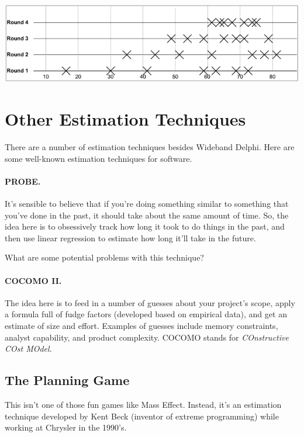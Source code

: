 \includegraphics[width=\textwidth]{images/converging-effort-estimates.png}

\section*{Other Estimation Techniques}
There are a number of estimation techniques besides Wideband Delphi.
Here are some well-known estimation techniques for software.

\paragraph{PROBE.} It's sensible to believe that if you're doing something
similar to something that you've done in the past, it should take about
the same amount of time. So, the idea here is to obsessively track
how long it took to do things in the past, and then use linear
regression to estimate how long it'll take in the future. 

{\sf What are some potential problems with this technique?}\\[3em]


\paragraph{COCOMO II.} The idea here is to feed in a number of guesses
about your project's scope, apply a formula full of fudge factors
(developed based on empirical data), and get an estimate of size and
effort. Examples of guesses include memory constraints, analyst
capability, and product complexity.  COCOMO stands for
\emph{COnstructive COst MOdel}.

\subsection*{The Planning Game} 
This isn't one of those fun games like Mass Effect. Instead, it's an
estimation technique developed by Kent Beck (inventor of extreme
programming) while working at Chrysler in the 1990's.

